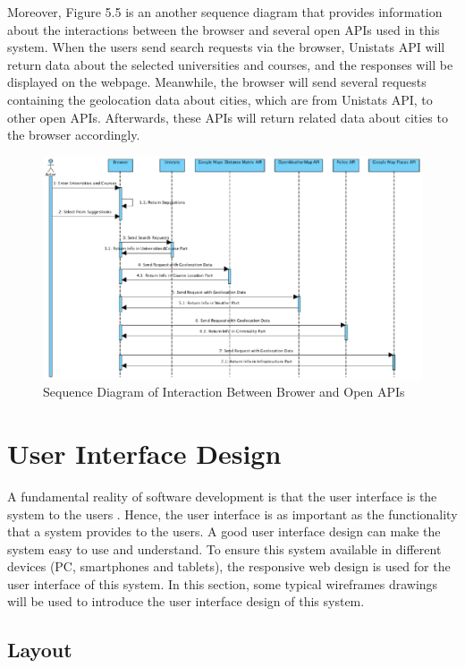 Moreover, Figure 5.5 is an another sequence diagram that provides information about the interactions between the browser and several open APIs used in this system. When the users send search requests via the browser, Unistats API will return data about the selected universities and courses, and the responses will be displayed on the webpage. Meanwhile, the browser will send several requests containing the geolocation data about cities, which are from Unistats API, to other open APIs. Afterwards, these APIs will return related data about cities to the browser accordingly.



\begin{figure}[H]
  \centering
  \includegraphics[width=15cm]{./img/Picture11}
  \caption{Sequence Diagram of Interaction Between Brower and Open APIs}
  \label{Figure:figex}
\end{figure}


\section{User Interface Design
}

A fundamental reality of software development is that the user interface is the system to the users \cite{ambler2000user}. Hence, the user interface is as important as the functionality that a system provides to the users. A good user interface design can make the system easy to use and understand. To ensure this system available in different devices (PC, smartphones and tablets), the responsive web design is used for the user interface of this system. In this section, some typical wireframes drawings will be used to introduce the user interface design of this system.


\subsection{Layout}

